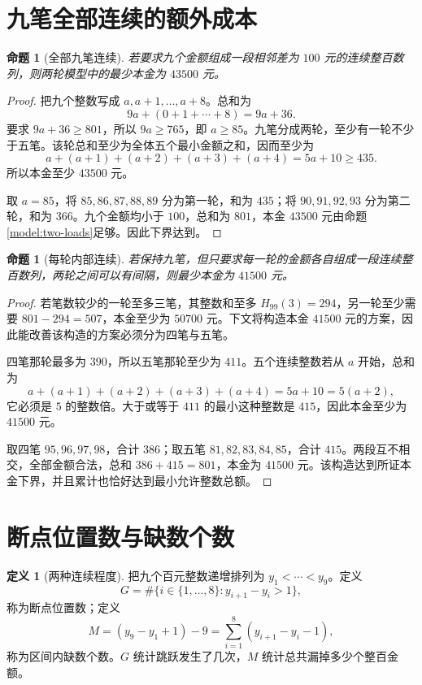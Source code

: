\documentclass[UTF8,a4paper]{ctexbook}
\newtheorem{proposition}[theorem]{命题}
\theoremstyle{definition}
\newtheorem{definition}[theorem]{定义}
\numberwithin{equation}{chapter}
\newcommand{\1}{\mathbf{1}}
\begin{document}
\section{九笔全部连续的额外成本}
\begin{proposition}[全部九笔连续]\label{seq:all-contiguous}
若要求九个金额组成一段相邻差为 $100$ 元的连续整百数列，则两轮模型中的最少本金为 $43500$ 元。
\end{proposition}
\begin{proof}
把九个整数写成 $a,a+1,\ldots,a+8$。总和为
\[
9a+(0+1+\cdots+8)=9a+36.
\]
要求 $9a+36\ge801$，所以 $9a\ge765$，即 $a\ge85$。九笔分成两轮，至少有一轮不少于五笔。该轮总和至少为全体五个最小金额之和，因而至少为
\[
a+(a+1)+(a+2)+(a+3)+(a+4)=5a+10\ge435.
\]
所以本金至少 $43500$ 元。

取 $a=85$，将 $85,86,87,88,89$ 分为第一轮，和为 $435$；将 $90,91,92,93$ 分为第二轮，和为 $366$。九个金额均小于 $100$，总和为 $801$，本金 $43500$ 元由命题\ref{model:two-loads}足够。因此下界达到。
\end{proof}

\begin{proposition}[每轮内部连续]\label{seq:each-contiguous}
若保持九笔，但只要求每一轮的金额各自组成一段连续整百数列，两轮之间可以有间隔，则最少本金为 $41500$ 元。
\end{proposition}
\begin{proof}
若笔数较少的一轮至多三笔，其整数和至多 $H_{99}(3)=294$，另一轮至少需要 $801-294=507$，本金至少为 $50700$ 元。下文将构造本金 $41500$ 元的方案，因此能改善该构造的方案必须分为四笔与五笔。

四笔那轮最多为 $390$，所以五笔那轮至少为 $411$。五个连续整数若从 $a$ 开始，总和为
\[
a+(a+1)+(a+2)+(a+3)+(a+4)=5a+10=5(a+2),
\]
它必须是 $5$ 的整数倍。大于或等于 $411$ 的最小这种整数是 $415$，因此本金至少为 $41500$ 元。

取四笔 $95,96,97,98$，合计 $386$；取五笔 $81,82,83,84,85$，合计 $415$。两段互不相交，全部金额合法，总和 $386+415=801$，本金为 $41500$ 元。该构造达到所证本金下界，并且累计也恰好达到最小允许整数总额。
\end{proof}

\section{断点位置数与缺数个数}
\begin{definition}[两种连续程度]\label{seq:gaps-def}
把九个百元整数递增排列为 $y_1<\cdots<y_9$。定义
\[
G=\#\{i\in\{1,\ldots,8\}:y_{i+1}-y_i>1\},
\]
称为断点位置数；定义
\[
M=(y_9-y_1+1)-9
=\sum_{i=1}^{8}(y_{i+1}-y_i-1),
\]
称为区间内缺数个数。$G$ 统计跳跃发生了几次，$M$ 统计总共漏掉多少个整百金额。
\end{definition}
\end{document}
